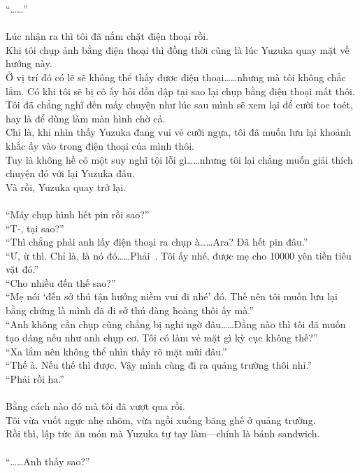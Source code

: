\documentclass[12pt,a4paper, twosides]{book}
\begin{document}
“……”\\
\\
Lúc nhận ra thì tôi đã nắm chặt điện thoại rồi.\\
Khi tôi chụp ảnh bằng điện thoại thì đồng thời cũng là lúc Yuzuka quay mặt về hướng này.\\
Ở vị trí đó có lẽ sẽ không thể thấy được điện thoại……nhưng mà tôi không chắc lắm. Có khi tôi sẽ bị cô ấy hỏi dồn dập tại sao lại chụp bằng điện thoại mất thôi.\\
Tôi đã chẳng nghĩ đến mấy chuyện như lúc sau mình sẽ xem lại để cười toe toét, hay là để dùng làm màn hình chờ cả.\\
Chỉ là, khi nhìn thấy Yuzuka đang vui vẻ cưỡi ngựa, tôi đã muốn lưu lại khoảnh khắc ấy vào trong điện thoại của mình thôi.\\
Tuy là không hề có một suy nghĩ tội lỗi gì……nhưng tôi lại chẳng muốn giải thích chuyện đó với lại Yuzuka đâu.\\
Và rồi, Yuzuka quay trở lại.\\
\\
“Máy chụp hình hết pin rồi sao?”\\
“T-, tại sao?”\\
“Thì chẳng phải anh lấy điện thoại ra chụp à……Ara? Đã hết pin đâu.”\\
“Ư, ừ thì. Chỉ là, là nó đó……Phải~. Tôi ấy nhé, được mẹ cho 10000 yên tiền tiêu vặt đó.”\\
“Cho nhiều đến thế sao?”\\
“Mẹ nói ‘đến sở thú tận hưởng niềm vui đi nhé’ đó. Thế nên tôi muốn lưu lại bằng chứng là mình đã đi sở thú đàng hoàng thôi ấy mà.”\\
“Anh không cần chụp cũng chẳng bị nghi ngờ đâu……Đằng nào thì tôi đã muốn tạo dáng nếu như anh chụp cơ. Tôi có làm vẻ mặt gì kỳ cục không thế?”\\
“Xa lắm nên không thể nhìn thấy rõ mặt mũi đâu.”\\
“Thế à. Nếu thế thì được. Vậy mình cùng đi ra quảng trường thôi nhỉ.”\\
“Phải rồi ha.”\\
\\
Bằng cách nào đó mà tôi đã vượt qua rồi.\\
Tôi vừa vuốt ngực nhẹ nhõm, vừa ngồi xuống băng ghế ở quảng trường.\\
Rồi thì, lập tức ăn món mà Yuzuka tự tay làm—chính là bánh sandwich.\\
\\
“……Anh thấy sao?”\\
\end{document}
